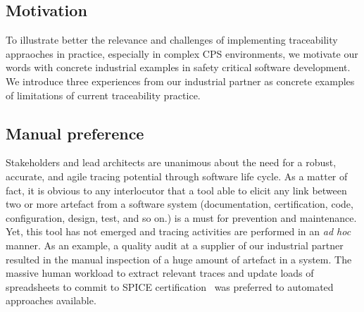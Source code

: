 \subsection{Motivation}\label{sec:motivation}

To illustrate better the relevance and challenges of implementing traceability appraoches in practice, especially in complex CPS environments, we motivate our words with concrete industrial examples in safety critical software development. We introduce three experiences from our industrial partner as concrete examples of limitations of current traceability practice.  


\subsection{Manual preference}
Stakeholders and lead architects are unanimous about the need for a robust, accurate, and agile tracing potential through software life cycle. As a matter of fact, it is obvious to any interlocutor that a tool able to elicit any link between two or more artefact from a software system (documentation, certification, code, configuration, design, test, and so on.) is a must for prevention and maintenance. Yet, this tool has not emerged and tracing activities are performed in an \textit{ad hoc} manner. 
As an example, a quality audit at a supplier of our industrial partner resulted in the manual inspection of a huge amount of artefact in a system. The massive human workload to extract relevant traces and update loads of spreadsheets to commit to SPICE certification~\cite{SPICE-ISO15504} was preferred to automated approaches available. 



